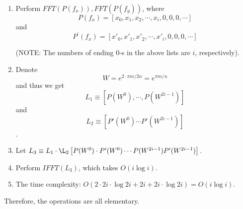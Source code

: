 \begin{questions}
\begin{parts}
\begin{enumerate}[(1)]
            \item Perform $FFT(P(f_x)), FFT(P(f_y))$, where
            \[
                P(f_x)=\left[ x_0,x_1,x_2, \cdots, x_i,0,0,0, \cdots \right]             
            \]
            and
            \[
                P^\prime(f_x)=[x'_0,x'_1,x'_2, \cdots, x'_i,0,0,0,\cdots]
            \]
            
            (NOTE: The numbers of ending 0-s in the above lists are $i$, respectively).
            
            \item Denote \[ W=e^{2\cdot \pi m/2n}=e^{\pi m/n} \] and thus we get \[ L_1\equiv \left[ P(W^0), \cdots, P(W^{2i-1}) \right] \] and \[ L_2 \equiv \left[ P'(W^0)\cdots P'(W^{2i-1}) \right] \].
            
            \item Let $L_3 \equiv L_1 \cdot \L_2 \left[ P(W^0)\cdot P'(W^0)\cdots P(W^{2i-1})P'(W^{2i-1})\right]$.
            
            \item Perform $IFFT(L_3)$, which takes $O(i\log i)$.
            
            \item The time complexity: $O(2\cdot 2i\cdot \log 2i +2i+2i\cdot \log 2i)=O(i\log i)$.
        
        \end{enumerate}

        Therefore, the operations are all elementary.

    \end{parts}
\end{questions}

